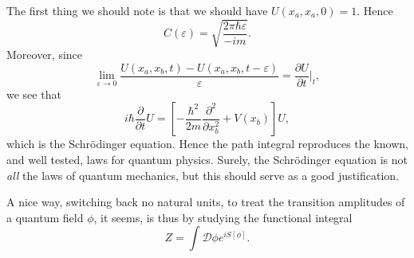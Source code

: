 \documentclass[twoside,utf8]{article}
\begin{document}
The first thing we should note is that we should have $U(x_a,x_a,0)=1$. Hence
\[
C(\varepsilon) = \sqrt{\frac{2 \pi \hbar \varepsilon }{-im}}.
\]
Moreover, since
\[
\lim_{\varepsilon \rightarrow 0} \frac{U(x_a,x_b,t)-U(x_a,x_b,t-\varepsilon)}{\varepsilon}
= \frac{\partial U}{\partial t}\bigg|_{t},
\]
we see that
\[
i\hbar \frac{\partial}{\partial t} U = \left[-\frac{\hbar^2}{2m} \frac{\partial^2}{\partial x_b^2}+ V\left(x_b\right)\right]U,
\]
which is the Schr\"odinger equation. Hence the path integral reproduces the known, and well tested, laws for quantum physics. Surely, the Schr\"odinger equation is not {\it all} the laws of quantum mechanics, but this should serve as a good justification.

A nice way, switching back no natural units, to treat the transition amplitudes of a quantum field $\phi$, it seems, is thus by studying the functional integral
\[
Z = \int \mathcal{D}\phi e^{iS[\phi]}.
\]


%
%
%
\end{document}

